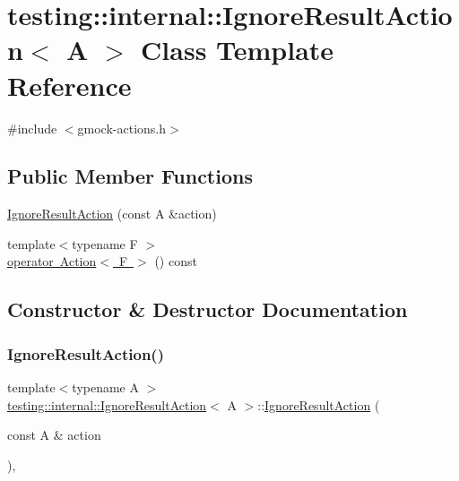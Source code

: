 \hypertarget{classtesting_1_1internal_1_1IgnoreResultAction}{}\section{testing\+::internal\+::Ignore\+Result\+Action$<$ A $>$ Class Template Reference}
\label{classtesting_1_1internal_1_1IgnoreResultAction}


{\ttfamily \#include $<$gmock-\/actions.\+h$>$}

\subsection*{Public Member Functions}
\begin{DoxyCompactItemize}
\item 
\mbox{\hyperlink{classtesting_1_1internal_1_1IgnoreResultAction_a9199f7b1b7771b2e2a5fd28caf624623}{Ignore\+Result\+Action}} (const A \&action)
\item 
{\footnotesize template$<$typename F $>$ }\\\mbox{\hyperlink{classtesting_1_1internal_1_1IgnoreResultAction_affb8b7439604c860e1416f45339c6e37}{operator Action$<$ F $>$}} () const
\end{DoxyCompactItemize}


\subsection{Constructor \& Destructor Documentation}
\mbox{\label{classtesting_1_1internal_1_1IgnoreResultAction_a9199f7b1b7771b2e2a5fd28caf624623}} 
\subsubsection{\texorpdfstring{IgnoreResultAction()}{IgnoreResultAction()}}
{\footnotesize\ttfamily template$<$typename A $>$ \\
\mbox{\hyperlink{classtesting_1_1internal_1_1IgnoreResultAction}{testing\+::internal\+::\+Ignore\+Result\+Action}}$<$ A $>$\+::\mbox{\hyperlink{classtesting_1_1internal_1_1IgnoreResultAction}{Ignore\+Result\+Action}} (\begin{DoxyParamCaption}\item[{const A \&}]{action }\end{DoxyParamCaption})\hspace{0.3cm}{\ttfamily [inline]}, {\ttfamily [explicit]}}



